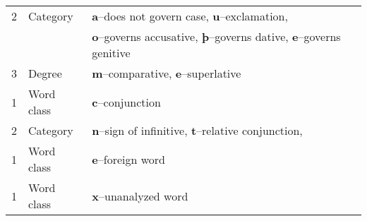 \documentclass[11pt]{article}
\begin{document}
\begin{spacing}{1.0}
\begin{table}[h]
\begin{center}
{\begin{tabular}{lll}
2 & Category & {\bf a}--does not govern case, {\bf u}--exclamation, \\
  & & {\bf o}--governs accusative, {\bf þ}--governs dative, {\bf e}--governs genitive \\
3 & Degree & {\bf m}--comparative, {\bf e}--superlative \\
\hline
1 & Word class & {\bf c}--conjunction \\
2 & Category & {\bf n}--sign of infinitive, {\bf t}--relative conjunction, \\
\hline
1 & Word class & {\bf e}--foreign word\\
\hline
1 & Word class & {\bf x}--unanalyzed word \\
\hline
\hline
\end{tabular}
}
\end{center}
\end{table}
\end{spacing}

\end{document}
